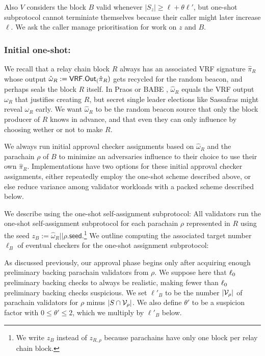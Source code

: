 Also $V$ considers the block $B$ valid whenever $|S_z| \ge \ell + \theta \ell'$, but one-shot subprotocol cannot terminiate themselves because their caller might later increase $\ell$.  We ask the caller manage prioritisation for work on $z$ and $B$.


%

\subsubsection{Initial one-shot:}

We recall that a relay chain block $R$ always has an associated VRF signature $\hat{\pi}_R$ whose output $\hat{\omega}_R := \mathsf{VRF}.\mathsf{Out}_(\hat{\pi}_R)$ gets recycled for the random beacon, and perhaps seals the block $R$ itself.  In Praos \cite{Praos} or BABE \cite{BABE}, $\hat{\omega}_R$ equals the VRF output $\omega_R$ that justifies creating $R$, but secret single leader elections like Sassafras \cite{Sassafras} might reveal $\omega_R$ early.  We want $\hat{\omega}_R$ to be the random beacon source that only the block producer of $R$ knows in advance, and that even they can only influence by choosing wether or not to make $R$.

We always run initial approval checker assignments based on $\hat{\omega}_R$ and the parachain $\rho$ of $B$ to minimize an adversaries influence to their choice to use their own $\hat{\pi}_R$.  Implementations have two options for these initial approval checker assignments, either repeatedly employ the one-shot scheme described above, or else reduce variance among validator workloads with a packed scheme described below.

We describe using the one-shot self-assignment subprotocol:  All validators run the one-shot self-assignment subprotocol for each parachain $\rho$ represented in $R$ using the seed $z_B := \hat{\omega}_R || \rho.\mathsf{seed}$.\footnote{We write $z_B$ instead of $z_{R,\rho}$ because parachains have only one block per relay chain block.}  We outline computing the associated target number $\ell_B$ of eventual checkers for the one-shot assignment subprotocol: 

As discussed previously, our approval phase begins only after acquiring enough preliminary backing parachain validators from $\rho$.  We suppose here that $\ell_0$ preliminary backing checks to always be realistic, making fewer than $\ell_0$ preliminary backing checks suspicious.  We set $\ell'_B$ to be the number $|\mathcal{V}_\rho|$ of parachain validators for $\rho$ minus $|S \cap \mathcal{V}_\rho|$. 
We also define $\theta'$ to be a suspicion factor with $0 \le \theta' \le 2$, which we multiply by $\ell'_B$ below.

